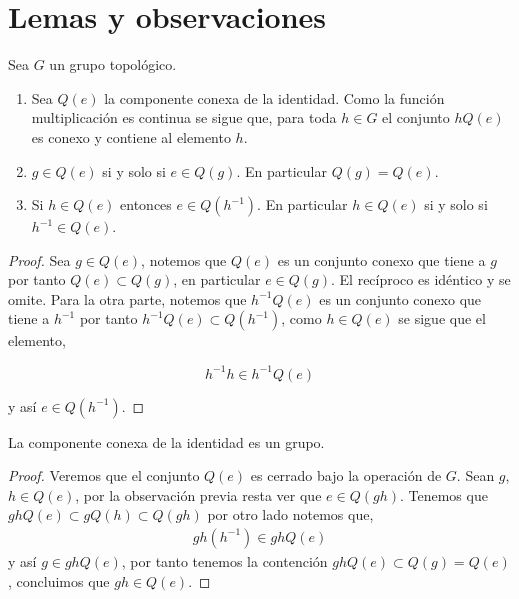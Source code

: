 

	


	


\section*{Lemas y observaciones}
	
\begin{ob}
	Sea $G$ un grupo topológico.
	
	\begin{enumerate}
	\item Sea $Q(e)$ la componente conexa de la identidad. Como la función multiplicación es continua se sigue que, para toda $h \in G$ el conjunto $hQ(e)$ es conexo y contiene al elemento $h$.

 \item $g \in Q(e)$ si y solo si $e \in Q(g).$ En particular $Q(g)=Q(e)$.
 
 \item  Si $h \in Q(e)$ entonces $e \in Q(h^{-1})$. En particular $h \in Q(e)$ si y solo si $h^{-1}\in Q(e)$.
	\end{enumerate}
 \end{ob}	
 
 \begin{proof}
 Sea $g \in Q(e)$, notemos que $Q(e)$ es un conjunto conexo que tiene a $g$ por tanto $Q(e) \subset Q(g)$, en particular $e \in Q(g).$ El recíproco es idéntico y se omite. Para la otra parte, notemos que $h^{-1}Q(e)$ es un conjunto conexo que tiene a $h^{-1}$ por tanto $h^{-1}Q(e) \subset Q(h^{-1})$, como $h \in Q(e)$ se sigue que el elemento,

$$h^{-1}h \in h^{-1}Q(e)$$

y así $e \in Q(h^{-1})$.  
\end{proof}

\begin{lm}\label{lm:Q(e) es grupo}
La componente conexa de la identidad es un grupo.
\end{lm}


\begin{proof}
 Veremos que el conjunto $Q(e)$ es cerrado bajo la operación de $G$. Sean $g$, $h \in Q(e)$, por la observación previa resta ver que $e \in Q(gh)$. Tenemos que $ ghQ(e) \subset gQ(h) \subset Q(gh)$ por otro lado notemos que, 
 \begin{align*}
 gh(h^{-1}) \in  ghQ(e)
 \end{align*}
 y así $g \in ghQ(e)$, por tanto tenemos la contención $ghQ(e) \subset Q(g)=Q(e)$, concluimos que $gh \in Q(e).$
 \end{proof}	
	
